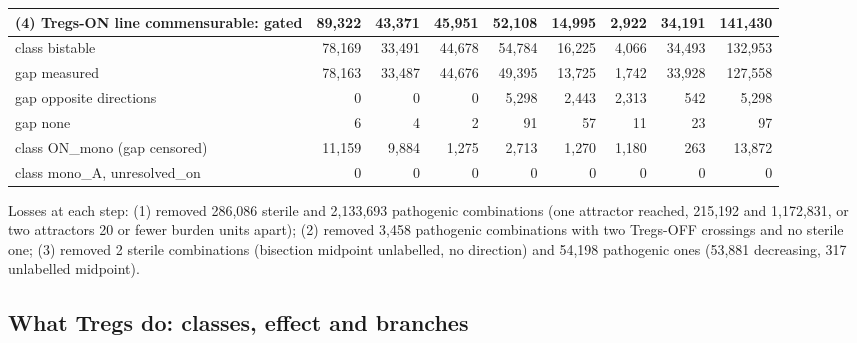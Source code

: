 \documentclass[11pt]{article}
\begin{document}
\begin{table}[H]
{\begin{tabular}{@{}lrrrrrrrr@{}}
(4) Tregs-ON line commensurable: \textbf{gated} & \textbf{89{,}322} & 43{,}371 & 45{,}951 & \textbf{52{,}108} & \textbf{14{,}995} & \textbf{2{,}922} & 34{,}191 & \textbf{141{,}430}\\
\midrule
class bistable & 78{,}169 & 33{,}491 & 44{,}678 & 54{,}784 & 16{,}225 & 4{,}066 & 34{,}493 & 132{,}953\\
\quad gap measured & 78{,}163 & 33{,}487 & 44{,}676 & 49{,}395 & 13{,}725 & 1{,}742 & 33{,}928 & 127{,}558\\
\quad gap opposite directions & 0 & 0 & 0 & 5{,}298 & 2{,}443 & 2{,}313 & 542 & 5{,}298\\
\quad gap none & 6 & 4 & 2 & 91 & 57 & 11 & 23 & 97\\
class ON\_mono (gap censored) & 11{,}159 & 9{,}884 & 1{,}275 & 2{,}713 & 1{,}270 & 1{,}180 & 263 & 13{,}872\\
class mono\_A, unresolved\_on & 0 & 0 & 0 & 0 & 0 & 0 & 0 & 0\\
\bottomrule
\end{tabular}}
\end{table}

Losses at each step: (1) removed 286,086 sterile and 2,133,693 pathogenic combinations
(one attractor reached, 215,192 and 1,172,831, or two attractors 20 or fewer burden
units apart); (2) removed 3,458 pathogenic combinations with two Tregs-OFF crossings and
no sterile one; (3) removed 2 sterile combinations (bisection midpoint unlabelled, no
direction) and 54,198 pathogenic ones (53,881 decreasing, 317 unlabelled midpoint).

\subsection{What Tregs do: classes, effect and branches}
\label{sec:classes}
\end{document}
